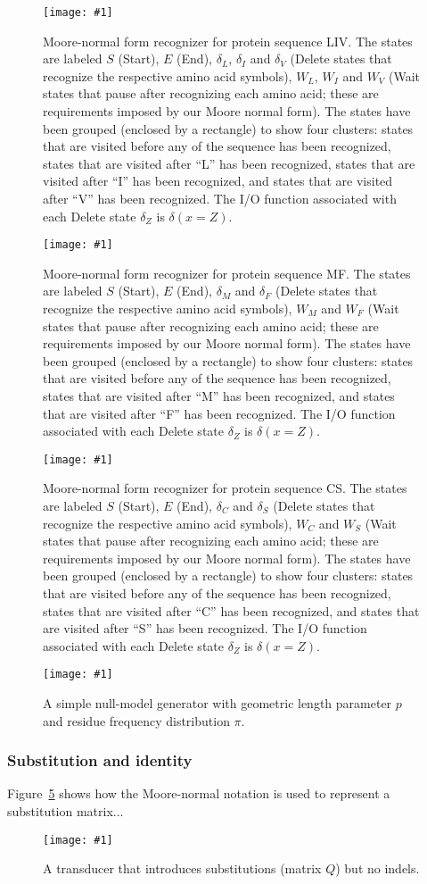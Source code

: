 \documentclass{article}
\newcommand{\figref}[1]{Figure~\ref{Figures.#1}}
\newcommand{\figlabel}[1]{\label{Figures.#1}}
\newcommand{\easyfig}[4]{
\begin{figure}
\texttt{[image: \#1]}
\caption{ \figlabel{#3} #4}
\end{figure}}
\newcommand{\pdffig}[2]{\easyfig{#1-fig.pdf}{}{#1}{#2}}
\newcommand{\tallpdffig}[2]{\easyfig{#1-fig.pdf}{height=\textheight}{#1}{#2}}
\begin{document}
\tallpdffig{liv-labeled}{Moore-normal form recognizer for protein sequence LIV.
The states are labeled $S$ (Start), $E$ (End),
$\delta_L$, $\delta_I$ and $\delta_V$ (Delete states that recognize the respective amino acid symbols),
$W_L$, $W_I$ and $W_V$ (Wait states that pause after recognizing each amino acid;
these are requirements imposed by our Moore normal form).
The states have been grouped (enclosed by a rectangle) to show four clusters:
 states that are visited before any of the sequence has been recognized,
 states that are visited after ``L'' has been recognized,
 states that are visited after ``I'' has been recognized,
and
 states that are visited after ``V'' has been recognized.
The I/O function associated with each Delete state $\delta_Z$ is $\delta(x=Z)$.}
\pdffig{mf-labeled}{Moore-normal form recognizer for protein sequence MF.
The states are labeled $S$ (Start), $E$ (End),
$\delta_M$ and $\delta_F$ (Delete states that recognize the respective amino acid symbols),
$W_M$ and $W_F$ (Wait states that pause after recognizing each amino acid;
these are requirements imposed by our Moore normal form).
The states have been grouped (enclosed by a rectangle) to show four clusters:
 states that are visited before any of the sequence has been recognized,
 states that are visited after ``M'' has been recognized,
and
 states that are visited after ``F'' has been recognized.
The I/O function associated with each Delete state $\delta_Z$ is $\delta(x=Z)$.}
\pdffig{cs-labeled}{Moore-normal form recognizer for protein sequence CS.
The states are labeled $S$ (Start), $E$ (End),
$\delta_C$ and $\delta_S$ (Delete states that recognize the respective amino acid symbols),
$W_C$ and $W_S$ (Wait states that pause after recognizing each amino acid;
these are requirements imposed by our Moore normal form).
The states have been grouped (enclosed by a rectangle) to show four clusters:
 states that are visited before any of the sequence has been recognized,
 states that are visited after ``C'' has been recognized,
and
 states that are visited after ``S'' has been recognized.
The I/O function associated with each Delete state $\delta_Z$ is $\delta(x=Z)$.}
\pdffig{null-model}{A simple null-model generator with geometric length parameter $p$ and residue frequency distribution $\pi$.}

\subsubsection{Substitution and identity}

\figref{substituter} shows how the Moore-normal notation is used to represent a substitution matrix...
\pdffig{substituter}{A transducer that introduces substitutions (matrix $Q$) but no indels.}
\end{document}
